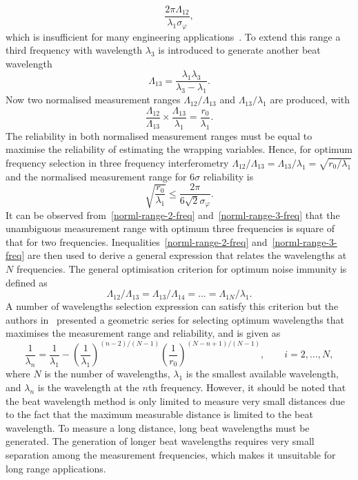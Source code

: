 \[
\frac{2\pi \Lambda_{12}}{\lambda_1\sigma_{\varphi}},
\]
which is insufficient for many engineering applications~\cite{Towers_frequency_selection_interferometry_2003}. To extend this range a third frequency with wavelength $\lambda_3$ is introduced to generate another beat wavelength
\[
\Lambda_{13} = \frac{\lambda_1\lambda_3}{\lambda_3 - \lambda_1}.
\]
Now two normalised measurement ranges $\Lambda_{12}/\Lambda_{13}$ and $\Lambda_{13}/\lambda_1$ are produced, with
\[
\frac{\Lambda_{12}}{\Lambda_{13}} \times \frac{\Lambda_{13}}{\lambda_1} = \frac{r_0}{\lambda_1}.
\]
The reliability in both normalised measurement ranges must be equal to maximise the reliability of estimating the wrapping variables. Hence, for optimum frequency selection in three frequency interferometry $\Lambda_{12}/\Lambda_{13} = \Lambda_{13}/\lambda_1 = \sqrt{r_0/\lambda_1}$ and the normalised measurement range for $6\sigma$ reliability is
\begin{equation}\label{norml-range-3-freq}
\sqrt{\frac{r_0}{\lambda_1}} \leq \frac{2\pi}{6\sqrt{2}\sigma_{\varphi}}.
\end{equation}
It can be observed from~\ref{norml-range-2-freq} and~\ref{norml-range-3-freq} that the unambiguous measurement range with optimum three frequencies is square of that for two frequencies. Inequalities~\ref{norml-range-2-freq} and~\ref{norml-range-3-freq} are then used to derive a general expression that relates the wavelengths at $N$ frequencies. The general optimisation  criterion for optimum noise immunity is defined as~\cite{Towers_frequency_selection_interferometry_2003}
\begin{equation}\label{general-optim-criterion}
\Lambda_{12}/\Lambda_{13} = \Lambda_{13}/\Lambda_{14} = \dots = \Lambda_{1N}/\lambda_{1}.
\end{equation}
A number of wavelengths selection expression can satisfy this criterion but the authors in~\cite{Towers_frequency_selection_interferometry_2003} presented a geometric series for selecting optimum wavelengths that maximises the measurement range and reliability, and is given as
\begin{equation}
\frac{1}{\lambda_n} = \frac{1}{\lambda_1} - \left( \frac{1}{\lambda_1} \right)^{(n-2)/(N-1)}\left(\frac{1}{r_0} \right)^{(N-n+1)/(N-1)}, \qquad i=2, \ldots, N,
\end{equation}
where $N$ is the number of wavelengths, $\lambda_1$ is the smallest available wavelength, and $\lambda_n$ is the wavelength at the $n$th frequency. However, it should be noted that the beat wavelength method is only limited to measure very small distances due to the fact that the maximum measurable distance is limited to the beat wavelength. To measure a long distance, long beat wavelengths must be generated. The generation of longer beat wavelengths requires very small separation among the measurement frequencies, which makes it unsuitable for long range applications. 

